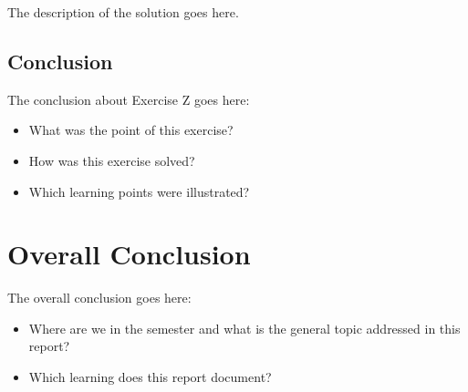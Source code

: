 \documentclass[12pt]{article}
\begin{document}
The description of the solution goes here.


\subsection{Conclusion}

The conclusion about Exercise Z goes here:

\begin{itemize}

\item
  What was the point of this exercise?

\item
  How was this exercise solved?

\item
  Which learning points were illustrated?

\end{itemize}


\newpage

\section{Overall Conclusion}

The overall conclusion goes here:

\begin{itemize}

\item
  Where are we in the semester and what is the general topic addressed in this report?

\item
  Which learning does this report document?

\end{itemize}

\end{document}
